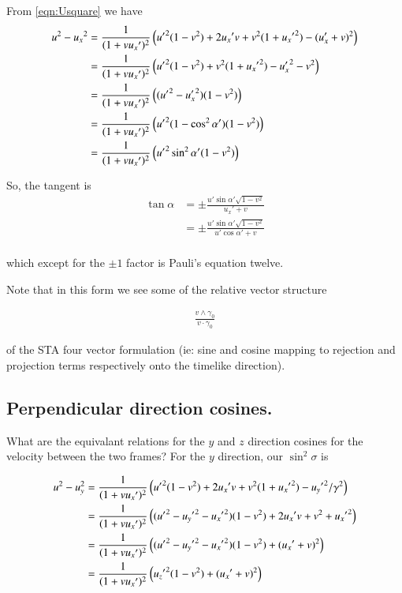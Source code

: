 \documentclass{article}
\begin{document}
From \ref{eqn:Usquare} we have
\begin{align*}
u^2 - {u_x}^2
&= \frac{1}{( 1 + v {u_x}' )^2 } \left(
{{u}'}^2(1-v^2)
+ 2 {u_x}' v
+v^2 (1 + {{u_x}'}^2)
-(u_x' + v)^2
\right) \\
&= \frac{1}{( 1 + v {u_x}' )^2 } \left(
{{u}'}^2(1-v^2)
+v^2 (1 + {{u_x}'}^2)
- {u_x'}^2 
- v^2 
\right) \\
&= \frac{1}{( 1 + v {u_x}' )^2 } \left(
({{u}'}^2 -{u_x'}^2) (1-v^2)
\right) \\
&= \frac{1}{( 1 + v {u_x}' )^2 } \left(
{{u}'}^2(1 -\cos^2\alpha') (1-v^2)
\right) \\
&= \frac{1}{( 1 + v {u_x}' )^2 } \left(
{{u}'}^2 \sin^2\alpha' (1-v^2)
\right) \\
\end{align*}

So, the tangent is
\begin{align*}
\tan\alpha 
&= \pm \frac{ u' \sin\alpha' \sqrt{1-v^2}}{ {u_x}' + v  } \\
&= \pm \frac{ u' \sin\alpha' \sqrt{1-v^2}}{ u'\cos\alpha' + v  } \\
\end{align*}

which except for the $\pm 1$ factor is Pauli's equation twelve.

Note that in this form we see some of the relative vector structure

\begin{align*}
\frac{v \wedge \gamma_0}{v \cdot \gamma_0}
\end{align*}

of the STA four vector formulation (ie: sine and cosine mapping to rejection and projection terms respectively onto the timelike direction).

\subsection{ Perpendicular direction cosines. }

What are the equivalant relations for the $y$ and $z$ direction cosines for the velocity between the two frames?  For the $y$ direction, our $\sin^2\sigma$ is

\begin{align*}
u^2 - u_y^2
&=
\frac{1}{( 1 + v {u_x}' )^2 } \left(
{{u}'}^2(1-v^2)
+ 2 {u_x}' v
+v^2 (1 + {{u_x}'}^2)
-{{u_y}'}^2/\gamma^2
\right) \\
&=
\frac{1}{( 1 + v {u_x}' )^2 } \left(
({{u}'}^2 - {{u_y}'}^2 -{{u_x}'}^2)(1-v^2)
+ 2 {u_x}' v
+v^2 
+ {{u_x}'}^2
\right) \\
&=
\frac{1}{( 1 + v {u_x}' )^2 } \left(
({{u}'}^2 - {{u_y}'}^2 -{{u_x}'}^2)(1-v^2)
+ ({u_x}' + v)^2
\right) \\
&=
\frac{1}{( 1 + v {u_x}' )^2 } \left(
{{u_z}'}^2(1-v^2)
+ ({u_x}' + v)^2
\right) \\
\end{align*}
\end{document}
